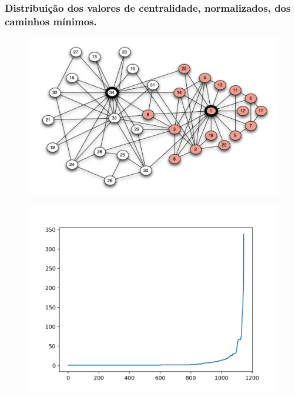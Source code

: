 \documentclass{beamer}
\begin{document}
        \begin{frame}
            \frametitle{Distribuição dos valores de centralidade, normalizados, dos caminhos mínimos.}
            \begin{minipage}{\textwidth}
                \begin{minipage}[b]{0.49\textwidth}
                    \begin{figure}
                        \centering
                        \includegraphics[scale=0.2]{karate-club-network.png}
                    \end{figure}
                \end{minipage}
                \hfill
                \begin{minipage}[b]{0.49\textwidth}
                    \begin{figure}
                        \centering
                        \includegraphics[scale=0.3]{short_path_centrality_ex2.png}
                    \end{figure}
                \end{minipage}
            \end{minipage}
        \end{frame}
\end{document}
